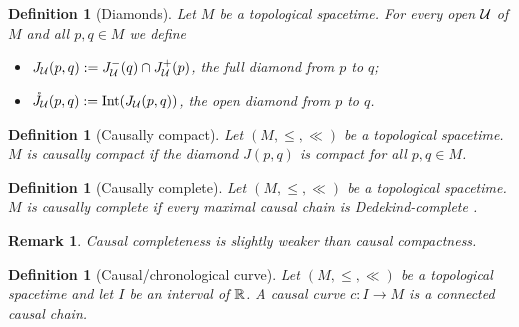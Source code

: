 \documentclass[a4paper,twoside]{article}
\newtheorem{defi}[lem]{Definition}
\newtheorem{rem}[lem]{Remark}
\begin{document}
\begin{defi}[Diamonds]\label{def:diamonds}
Let $M$ be a topological spacetime. For every open $\mathcal{U}$ of $M$ and all $p,q \in M$ we define
\begin{itemize}
\item $J_{\mathcal{U}}(p,q) := J^-_{\mathcal{U}}(q)\cap J^+_{\mathcal{U}}(p)$, the full diamond from $p$ to $q$;
\item $\ring{J}_\U(p,q): = \mathrm{Int}(J_\U(p,q))$, the open diamond from $p$ to $q$.
\end{itemize}
\end{defi}

\begin{defi}[Causally compact]\label{def:causally_compact}
Let $(M,\leq,\ll)$ be a topological spacetime. $M$ is causally compact if the diamond $J(p,q)$ is compact for all $p,q\in M$.
\end{defi}
\begin{defi}[Causally complete]\label{def:causally_complete}
Let $(M,\leq,\ll)$ be a topological spacetime. $M$ is causally complete if every maximal causal chain is Dedekind-complete \cite{MR1631533}.
\end{defi}
\begin{rem}\label{rem:causal_completeness_slightly_weaker}
Causal completeness is slightly weaker than causal compactness.
\end{rem}

\begin{defi}[Causal/chronological curve]\label{def:causal_chronological_curve} Let $(M,\leq,\ll)$ be a topological spacetime and let $I$ be an interval of $\mathbb R$. A causal curve $c:I\rightarrow M$ is a connected causal chain.
\end{defi}
\end{document}
